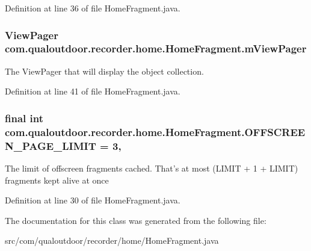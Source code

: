 Definition at line 36 of file Home\-Fragment.\-java.

\hypertarget{classcom_1_1qualoutdoor_1_1recorder_1_1home_1_1HomeFragment_a8aab3610e0ef7876cc0998d8d493977e}{
\subsubsection[{m\-View\-Pager}]{\setlength{\rightskip}{0pt plus 5cm}View\-Pager com.\-qualoutdoor.\-recorder.\-home.\-Home\-Fragment.\-m\-View\-Pager\hspace{0.3cm}{\ttfamily [private]}}}\label{classcom_1_1qualoutdoor_1_1recorder_1_1home_1_1HomeFragment_a8aab3610e0ef7876cc0998d8d493977e}
The View\-Pager that will display the object collection. 

Definition at line 41 of file Home\-Fragment.\-java.

\hypertarget{classcom_1_1qualoutdoor_1_1recorder_1_1home_1_1HomeFragment_a032167f374f1a63be629e445733d0a8d}{
\subsubsection[{O\-F\-F\-S\-C\-R\-E\-E\-N\-\_\-\-P\-A\-G\-E\-\_\-\-L\-I\-M\-I\-T}]{\setlength{\rightskip}{0pt plus 5cm}final int com.\-qualoutdoor.\-recorder.\-home.\-Home\-Fragment.\-O\-F\-F\-S\-C\-R\-E\-E\-N\-\_\-\-P\-A\-G\-E\-\_\-\-L\-I\-M\-I\-T = 3\hspace{0.3cm}{\ttfamily [static]}, {\ttfamily [private]}}}\label{classcom_1_1qualoutdoor_1_1recorder_1_1home_1_1HomeFragment_a032167f374f1a63be629e445733d0a8d}
The limit of offscreen fragments cached. That's at most (L\-I\-M\-I\-T + 1 + L\-I\-M\-I\-T) fragments kept alive at once 

Definition at line 30 of file Home\-Fragment.\-java.



The documentation for this class was generated from the following file\-:\begin{DoxyCompactItemize}
\item 
src/com/qualoutdoor/recorder/home/Home\-Fragment.\-java\end{DoxyCompactItemize}
